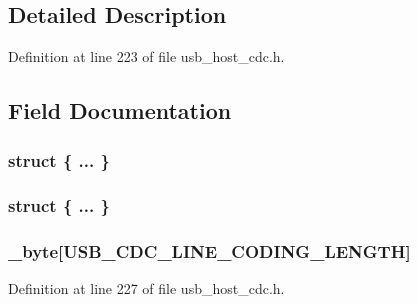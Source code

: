 \subsection{Detailed Description}


Definition at line 223 of file usb\+\_\+host\+\_\+cdc.\+h.



\subsection{Field Documentation}
\hypertarget{union___u_s_b___c_d_c___l_i_n_e___c_o_d_i_n_g_a3928679c844818ba8db5c88e08ca60bd}{}\subsubsection[{"@399}]{\setlength{\rightskip}{0pt plus 5cm}struct \{ ... \} }\label{union___u_s_b___c_d_c___l_i_n_e___c_o_d_i_n_g_a3928679c844818ba8db5c88e08ca60bd}
\hypertarget{union___u_s_b___c_d_c___l_i_n_e___c_o_d_i_n_g_a2a186e912b5080cf4998159dece2e6a7}{}\subsubsection[{"@401}]{\setlength{\rightskip}{0pt plus 5cm}struct \{ ... \} }\label{union___u_s_b___c_d_c___l_i_n_e___c_o_d_i_n_g_a2a186e912b5080cf4998159dece2e6a7}
\hypertarget{union___u_s_b___c_d_c___l_i_n_e___c_o_d_i_n_g_a5f30077f01d59764c545d489904b43ba}{}
\subsubsection[{\+\_\+byte}]{ \+\_\+byte\mbox{[}{\bf U\+S\+B\+\_\+\+C\+D\+C\+\_\+\+L\+I\+N\+E\+\_\+\+C\+O\+D\+I\+N\+G\+\_\+\+L\+E\+N\+G\+T\+H}\mbox{]}}\label{union___u_s_b___c_d_c___l_i_n_e___c_o_d_i_n_g_a5f30077f01d59764c545d489904b43ba}


Definition at line 227 of file usb\+\_\+host\+\_\+cdc.\+h.

\hypertarget{union___u_s_b___c_d_c___l_i_n_e___c_o_d_i_n_g_a946f73bf80c1a1df593f506d5381c22f}{}
